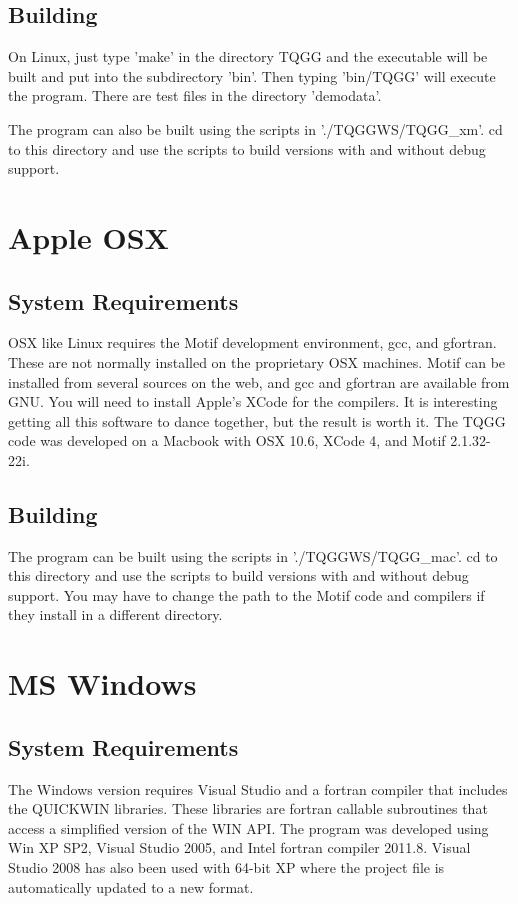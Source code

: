 \documentclass[10pt]{article}
\begin{document}
\subsection{Building}
On Linux, just type 'make' in the directory TQGG and the executable will be built and put into the
subdirectory 'bin'. Then typing 'bin/TQGG' will execute the program. There are test files in 
the directory 'demodata'.

The program can also be built using the scripts in './TQGGWS/TQGG\_xm'. cd to this directory and
use the scripts to build versions with and without debug support.

\section{Apple OSX}
\subsection{System Requirements}
OSX like Linux requires the Motif development environment, gcc, and gfortran. These are
not normally installed on the proprietary OSX machines. Motif can be installed from several
sources on the web, and gcc and gfortran are available from GNU. You will need to install
Apple's XCode for the compilers. It is interesting getting all this software to dance together,
but the result is worth it. The TQGG code was developed on a Macbook with OSX 10.6,
XCode 4, and Motif 2.1.32-22i.

\subsection{Building}
The program can be built using the scripts in './TQGGWS/TQGG\_mac'. cd to this directory and
use the scripts to build versions with and without debug support. You may have to change the 
path to the Motif code and compilers if they install in a different directory.

\section{MS Windows}
\subsection{System Requirements}
The Windows version requires Visual Studio and a fortran compiler that includes the QUICKWIN
libraries. These libraries are fortran callable subroutines that access a simplified version
of the WIN API. The program was developed using Win XP SP2, Visual Studio 2005, and Intel fortran
compiler 2011.8. Visual Studio 2008 has also been used with 64-bit XP where the project file is
automatically updated to a new format.
\end{document}
